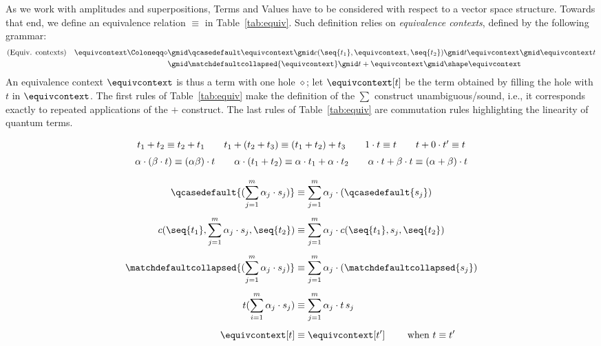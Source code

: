 As we work with amplitudes and superpositions, Terms and Values have to be
considered with respect to a vector space
structure. Towards that end, we define an equivalence relation $\equiv$ in
Table~\ref{tab:equiv}. Such definition relies on \emph{equivalence contexts},
defined by the following grammar:
\[
  \begin{aligned}
    (\text{Equiv. contexts}) \quad   \equivcontext \Coloneqq \diamond & \gmid
    \qcasedefault \equivcontext \gmid c(\seq{t_1}, \equivcontext, \seq{t_2})
    \gmid t \equivcontext \gmid \equivcontext t\\
    &\gmid \matchdefaultcollapsed{\equivcontext}  \gmid t + \equivcontext \gmid
    \shape \equivcontext
  \end{aligned}
\]
An equivalence context $\equivcontext$ is thus a term with one hole $\diamond$;
let $\equivcontext[t]$ be the term obtained by filling the hole with
$t$ in $\equivcontext$.
The first rules of Table~\ref{tab:equiv} make the definition of the $\sum$
construct unambiguous/sound, i.e., it corresponds exactly to repeated
applications of the $+$ construct. The last rules of Table~\ref{tab:equiv} are
commutation rules highlighting the linearity of quantum terms.

\begingroup
\renewcommand\displaystyle\textstyle
\newcommand\sep{\\[1.25ex]}
\begin{table}[t]
  \centering
  \[
    \begin{array}{c}
      t_1 + t_2 \equiv t_2 + t_1
      \qquad
      t_1 + (t_2 + t_3) \equiv (t_1 + t_2) + t_3
      \qquad
      1 \cdot t \equiv t
      \qquad
      t + 0 \cdot t' \equiv t
      \sep
      \alpha \cdot (\beta \cdot t) \equiv (\alpha \beta) \cdot t
      \qquad
      \alpha \cdot (t_1 + t_2) \equiv \alpha \cdot t_1 + \alpha \cdot t_2
      \qquad
      \alpha \cdot t + \beta \cdot t \equiv (\alpha + \beta) \cdot t
      \\[1.2em]
      \begin{aligned}
        \qcasedefault {(\sum_{j=1}^m \alpha_j \cdot s_j)} &\equiv
        \sum_{j=1}^m \alpha_j \cdot (\qcasedefault{s_j})
        \sep
        c(\seq{t_1}, \sum_{j=1}^m \alpha_j \cdot s_j,
        \seq{t_2}) &\equiv \sum_{j=1}^m \alpha_j \cdot
        c(\seq{t_1}, s_j, \seq{t_2})
        \sep
        \matchdefaultcollapsed{(\sum_{j=1}^m \alpha_j \cdot s_j)}
        &\equiv \sum_{j=1}^m \alpha_j \cdot (\matchdefaultcollapsed{s_j})
        \sep
        t(\sum_{i=1}^m \alpha_j \cdot s_j) &\equiv \sum_{j=1}^m
        \alpha_j \cdot t\,s_j
        \sep
        \equivcontext[t] &\equiv \equivcontext[t'] \qquad \text{ when
        } t \equiv t'
      \end{aligned}
    \end{array}
  \]
  \caption{Equivalence relation $\equiv\ \subseteq\ \text{Terms}
  \times \text{Terms}$}
  \label{tab:equiv}
\end{table}

